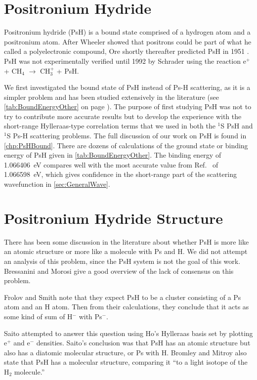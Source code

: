 \documentclass[Dissertation.tex]{subfiles}
\begin{document}
\section{Positronium Hydride}
\label{sec:PsH}
Positronium hydride (PsH) is a bound state comprised of 
a hydrogen atom and a positronium atom. After Wheeler \cite{Wheeler1946} 
showed that positrons could be part of what he called a polyelectronic 
compound, Ore shortly thereafter predicted PsH in 1951 \cite{Ore1951}. PsH 
was not experimentally verified until 1992 by Schrader \cite{Schrader1992}
using the reaction e$^+$ + CH$_4$ $\to$ CH$_3^+$ + PsH.

We first investigated the bound state of PsH instead of Ps-H scattering, as 
it is a simpler problem and has been studied extensively in the literature
(see \cref{tab:BoundEnergyOther} on page \pageref{tab:BoundEnergyOther}).
The purpose of first studying PsH was not to try to contribute more accurate
results but to develop the experience with the short-range Hylleraas-type 
correlation terms that we used in both the $^1$S PsH and $^1$S Ps-H
scattering problems. 
The full discussion of our work on PsH is found in \cref{chp:PsHBound}.
There are dozens of calculations of the ground state
or binding energy of PsH given in \cref{tab:BoundEnergyOther}.
The binding energy of \SI{1.066 406}{eV} compares well with the most accurate
value from Ref.~\cite{Bubin2006} of \SI{1.066 598}{eV}, which gives confidence
in the short-range part of the scattering wavefunction in
\cref{sec:GeneralWave}.



\section{Positronium Hydride Structure}
\label{sec:PsHStructure}
There has been some discussion in the literature about whether PsH is more 
like an atomic structure or more like a molecule with Ps and H. We did not 
attempt an analysis of this problem, since the PsH system is not the goal of 
this work. Bressanini and Morosi \cite{Bressanini2003} give a good overview 
of the lack of consensus on this problem. 

Frolov and Smith \cite{Frolov1997c} note that they expect PsH to be a cluster 
consisting of a Ps atom and an H atom. Then from their calculations, they 
conclude that it acts as some kind of sum of H$^-$ with Ps$^-$.

Saito \cite{Saito2000} attempted to answer this question using Ho's
\cite{Ho1986} Hylleraas basis set by plotting e$^+$ and e$^-$ densities. Saito's 
conclusion was that PsH has an atomic structure but also has a diatomic 
molecular structure, or Ps with H. Bromley and Mitroy \cite{Bromley2001} also 
state that PsH has a molecular structure, comparing it ``to a light isotope 
of the H$_2$ molecule.''
\end{document}

